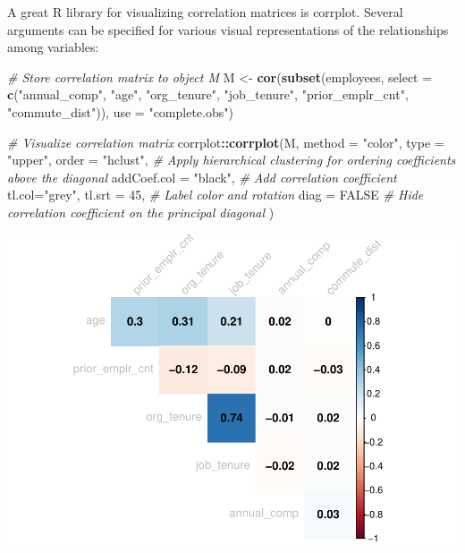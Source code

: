 \documentclass[]{book}
\newenvironment{Shaded}{\begin{snugshade}}{\end{snugshade}}
\newcommand{\CommentTok}[1]{\textcolor[rgb]{0.56,0.35,0.01}{\textit{#1}}}
\newcommand{\DataTypeTok}[1]{\textcolor[rgb]{0.13,0.29,0.53}{#1}}
\newcommand{\DecValTok}[1]{\textcolor[rgb]{0.00,0.00,0.81}{#1}}
\newcommand{\KeywordTok}[1]{\textcolor[rgb]{0.13,0.29,0.53}{\textbf{#1}}}
\newcommand{\NormalTok}[1]{#1}
\newcommand{\OperatorTok}[1]{\textcolor[rgb]{0.81,0.36,0.00}{\textbf{#1}}}
\newcommand{\OtherTok}[1]{\textcolor[rgb]{0.56,0.35,0.01}{#1}}
\newcommand{\StringTok}[1]{\textcolor[rgb]{0.31,0.60,0.02}{#1}}
\begin{document}
A great R library for visualizing correlation matrices is corrplot. Several arguments can be specified for various visual representations of the relationships among variables:

\begin{Shaded}
\begin{Highlighting}[]
\CommentTok{# Store correlation matrix to object M}
\NormalTok{M <-}\StringTok{ }\KeywordTok{cor}\NormalTok{(}\KeywordTok{subset}\NormalTok{(employees, }\DataTypeTok{select =} \KeywordTok{c}\NormalTok{(}\StringTok{"annual_comp"}\NormalTok{, }\StringTok{"age"}\NormalTok{, }\StringTok{"org_tenure"}\NormalTok{, }\StringTok{"job_tenure"}\NormalTok{, }\StringTok{"prior_emplr_cnt"}\NormalTok{, }\StringTok{"commute_dist"}\NormalTok{)), }\DataTypeTok{use =} \StringTok{"complete.obs"}\NormalTok{)}

\CommentTok{# Visualize correlation matrix}
\NormalTok{corrplot}\OperatorTok{::}\KeywordTok{corrplot}\NormalTok{(M, }\DataTypeTok{method =} \StringTok{"color"}\NormalTok{,  }
                   \DataTypeTok{type =} \StringTok{"upper"}\NormalTok{, }\DataTypeTok{order =} \StringTok{"hclust"}\NormalTok{, }\CommentTok{# Apply hierarchical clustering for ordering coefficients above the diagonal}
                   \DataTypeTok{addCoef.col =} \StringTok{"black"}\NormalTok{, }\CommentTok{# Add correlation coefficient}
                   \DataTypeTok{tl.col=}\StringTok{"grey"}\NormalTok{, }\DataTypeTok{tl.srt =} \DecValTok{45}\NormalTok{, }\CommentTok{# Label color and rotation}
                   \DataTypeTok{diag =} \OtherTok{FALSE} \CommentTok{# Hide correlation coefficient on the principal diagonal}
\NormalTok{                   )}
\end{Highlighting}
\end{Shaded}

\includegraphics{The_People_Analytics_Companion_files/figure-latex/unnamed-chunk-82-1.pdf}
\end{document}
